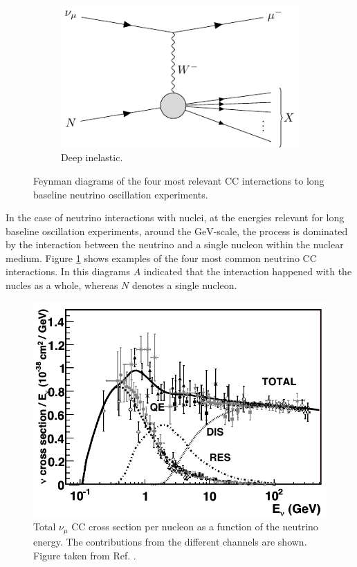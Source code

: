 \begin{figure}[t]
	\begin{subfigure}{0.5\textwidth}
		\centering
		\includegraphics[width=.90\linewidth]{Images//Nu/feynman_ccdis.pdf}
		\caption{Deep inelastic.}
	\end{subfigure}
	\caption{Feynman diagrams of the four most relevant CC interactions to long baseline neutrino oscillation experiments.}
	\label{fig:neutrino_cc_interactions}
\end{figure}

In the case of neutrino interactions with nuclei, at the energies relevant for long baseline oscillation experiments, around the $\mathrm{GeV}$-scale, the process is dominated by the interaction between the neutrino and a single nucleon within the nuclear medium. Figure \ref{fig:neutrino_cc_interactions} shows examples of the four most common neutrino CC interactions. In this diagrams $A$ indicated that the interaction happened with the nucles as a whole, whereas $N$ denotes a single nucleon.

\begin{figure}[t]
	\centering
	\includegraphics[width=.85\linewidth]{Images/Nu/numu_cc_cross_section.pdf}
	\caption[Total muon neutrino CC cross section per nucleon as a function of the neutrino energy.]{Total $\nu_{\mu}$ CC cross section per nucleon as a function of the neutrino energy. The contributions from the different channels are shown. Figure taken from Ref. \cite{Formaggio2012}.}
	\label{fig:numu_cc_cross_section}
\end{figure}

